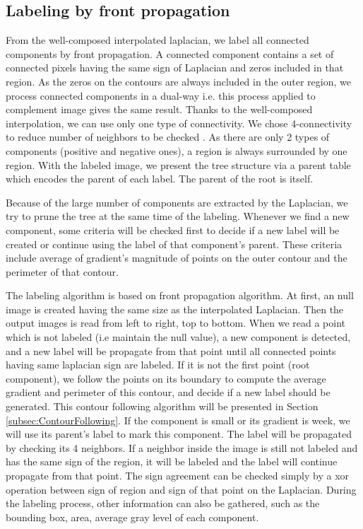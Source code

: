 \subsection{Labeling by front propagation} \label{labeling}
\par From the well-composed interpolated laplacian, we label all connected components by front propagation. A connected component contains a set of connected pixels having the same sign of Laplacian and zeros included in that region. As the zeros on the contours are always included in the outer region, we process connected components in a dual-way i.e. this process applied to complement image gives the same result. Thanks to the well-composed interpolation, we can use only one type of connectivity. We chose 4-connectivity to reduce number of neighbors to be checked . As there are only 2 types of components (positive and negative ones), a region is always surrounded by one region. With the labeled image, we present the tree structure via a parent table which encodes the parent of each label. The parent of the root is itself.
\par
Because of the large number of components are extracted by the Laplacian, we try to prune the tree at the same time of the labeling. Whenever we find a new component, some criteria will be checked first to decide if a new label will be created or continue using the label of that component's parent. These criteria include average of gradient's magnitude of points on the outer contour and the perimeter of that contour.
\par
The labeling algorithm is based on front propagation algorithm. At first, an null image is created having the same size as the interpolated Laplacian. Then the output images is read from left to right, top to bottom. When we read a point which is not labeled (i.e maintain the null value), a new component is detected, and a new label will be propagate from that point until all connected points having same laplacian sign are labeled. If it is not the first point (root component), we follow the points on its boundary to compute the average gradient and perimeter of this contour, and decide if a new label should be generated. This contour following algorithm will be presented in Section \ref{subsec:ContourFollowing}. If the component is small or its gradient is week, we will use its parent's label to mark this component. The label will be propagated by checking its 4 neighbors. If a neighbor inside the image is still not labeled and has the same sign of the region, it will be labeled and the label will continue propagate from that point. The sign agreement can be checked simply by a xor operation between sign of region and sign of that point on the Laplacian. During the labeling process, other information can also be gathered, such as the bounding box, area, average gray level of each component. 
